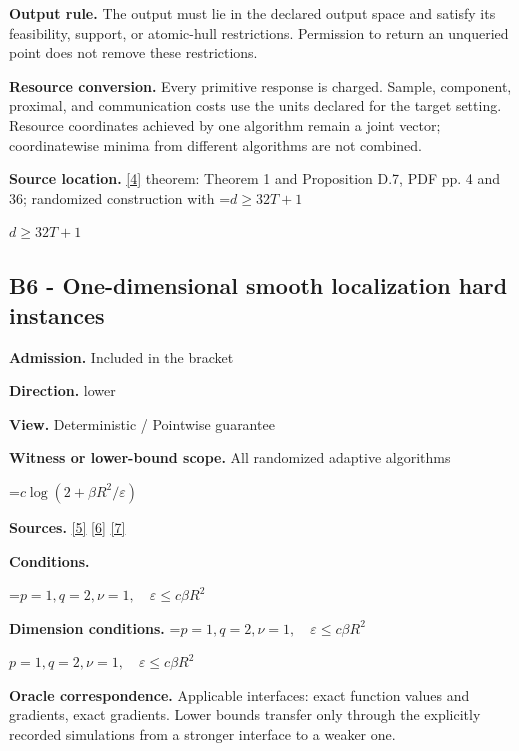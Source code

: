 \documentclass[10pt,a4paper]{article}
\newcommand{\AtlasMath}[1]{\par\begingroup\centering\setbox0=\hbox{$\displaystyle #1$}\ifdim\wd0>1.4\linewidth\typeout{ATLAS WIDE FORMULA: \the\wd0}\fi\ifdim\wd0>\linewidth\resizebox{\linewidth}{!}{\box0}\else\box0\fi\par\endgroup}
\newcommand{\AtlasInlineMath}[1]{\begingroup\setbox0=\hbox{$#1$}\ifdim\wd0>.4\linewidth\endgroup\AtlasMath{#1}\else\endgroup$#1$\fi}
\begin{document}
\textbf{Output rule.} The output must lie in the declared output space and satisfy its feasibility, support, or atomic-hull restrictions. Permission to return an unqueried point does not remove these restrictions.



\textbf{Resource conversion.} Every primitive response is charged. Sample, component, proximal, and communication costs use the units declared for the target setting. Resource coordinates achieved by one algorithm remain a joint vector; coordinatewise minima from different algorithms are not combined.



\textbf{Source location.} \href{https://arxiv.org/pdf/2609.32910}{[4]} theorem: Theorem 1 and Proposition D.7, PDF pp. 4 and 36; randomized construction with \AtlasInlineMath{d\ge32T+1}



\subsection{B6 - One-dimensional smooth localization hard instances}


\textbf{Admission.} Included in the bracket



\textbf{Direction.} lower



\textbf{View.} Deterministic / Pointwise guarantee



\textbf{Witness or lower-bound scope.} All randomized adaptive algorithms



\AtlasMath{c\log(2+\beta R^2/\varepsilon)}


\textbf{Sources.} \href{https://arxiv.org/pdf/2101.09740v2}{[5]} \href{https://arxiv.org/pdf/2609.33360v2}{[6]} \href{https://arxiv.org/pdf/2609.10874}{[7]}



\textbf{Conditions.}
\AtlasMath{p=1,q=2,\nu=1,\quad\varepsilon\le c\beta R^2}




\textbf{Dimension conditions.} \AtlasInlineMath{p=1,q=2,\nu=1,\quad\varepsilon\le c\beta R^2}



\textbf{Oracle correspondence.} Applicable interfaces: exact function values and gradients, exact gradients. Lower bounds transfer only through the explicitly recorded simulations from a stronger interface to a weaker one.
\end{document}

